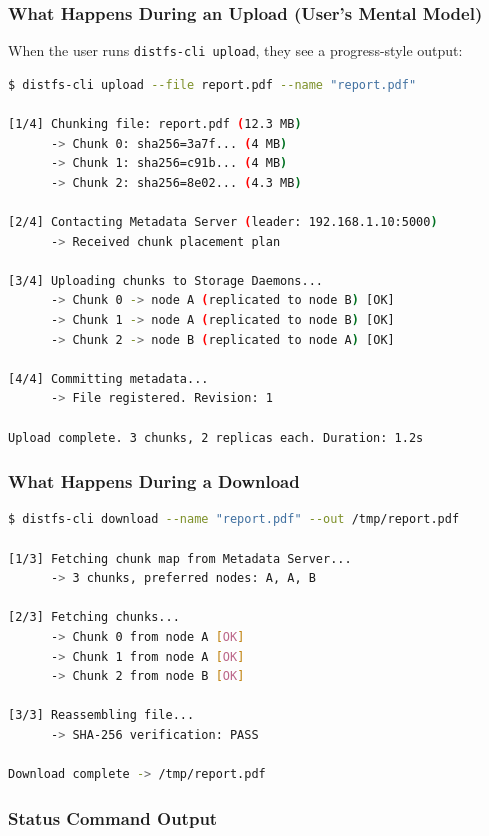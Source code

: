 \documentclass[12pt,a4paper]{article}
\begin{document}
\subsubsection{What Happens During an Upload (User's Mental Model)}

When the user runs \texttt{distfs-cli upload}, they see a progress-style output:

\begin{lstlisting}[language=bash, caption={Upload session output}]
$ distfs-cli upload --file report.pdf --name "report.pdf"

[1/4] Chunking file: report.pdf (12.3 MB)
      -> Chunk 0: sha256=3a7f... (4 MB)
      -> Chunk 1: sha256=c91b... (4 MB)
      -> Chunk 2: sha256=8e02... (4.3 MB)

[2/4] Contacting Metadata Server (leader: 192.168.1.10:5000)
      -> Received chunk placement plan

[3/4] Uploading chunks to Storage Daemons...
      -> Chunk 0 -> node A (replicated to node B) [OK]
      -> Chunk 1 -> node A (replicated to node B) [OK]
      -> Chunk 2 -> node B (replicated to node A) [OK]

[4/4] Committing metadata...
      -> File registered. Revision: 1

Upload complete. 3 chunks, 2 replicas each. Duration: 1.2s
\end{lstlisting}

\subsubsection{What Happens During a Download}

\begin{lstlisting}[language=bash, caption={Download session output}]
$ distfs-cli download --name "report.pdf" --out /tmp/report.pdf

[1/3] Fetching chunk map from Metadata Server...
      -> 3 chunks, preferred nodes: A, A, B

[2/3] Fetching chunks...
      -> Chunk 0 from node A [OK]
      -> Chunk 1 from node A [OK]
      -> Chunk 2 from node B [OK]

[3/3] Reassembling file...
      -> SHA-256 verification: PASS

Download complete -> /tmp/report.pdf
\end{lstlisting}

\subsubsection{Status Command Output}
\end{document}
